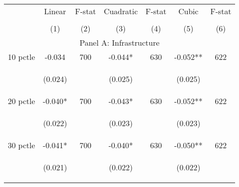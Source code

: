 \begin{tabular}{lcccccc}


\toprule


\multicolumn{1}{l}{} & \multicolumn{1}{c}{Linear} & \multicolumn{1}{c}{F-stat} & \multicolumn{1}{c}{Cuadratic} & \multicolumn{1}{c}{F-stat} & \multicolumn{1}{c}{Cubic} & \multicolumn{1}{c}{F-stat}  \\

\cmidrule(l{1mm}r{1mm}){2-3} \cmidrule(l{1mm}r{1mm}){4-5} \cmidrule(l{1mm}r{1mm}){6-7}   \\

 & (1) & (2) & (3) & (4) & (5) & (6)  \\ 
 

\hline

\multicolumn{7}{c}{Panel A: Infrastructure}   \\                                                          

10 pctle   &  -0.034   &  700  &   -0.044*  &  630 &  -0.052**  &  622 \\

\vspace{4pt} &  \begin{footnotesize}(0.024)\end{footnotesize}   & &
			    \begin{footnotesize}(0.025)\end{footnotesize}   & &
			    \begin{footnotesize}(0.025)\end{footnotesize}   & 
			     \\          


20 pctle   &  -0.040*   &  700  &   -0.043*  &  630 &  -0.052**  &  622   \\

\vspace{4pt} &  \begin{footnotesize}(0.022)\end{footnotesize}   & &
			    \begin{footnotesize}(0.023)\end{footnotesize}   & &
			    \begin{footnotesize}(0.023)\end{footnotesize}   &
			     \\          


30 pctle   &  -0.041*   &  700  &   -0.040*  &  630 &  -0.050**  &  622   \\


\vspace{4pt} &  \begin{footnotesize}(0.021)\end{footnotesize}   & &
			    \begin{footnotesize}(0.022)\end{footnotesize}   & &
			    \begin{footnotesize}(0.022)\end{footnotesize}   &
			     \\          




\end{tabular}
